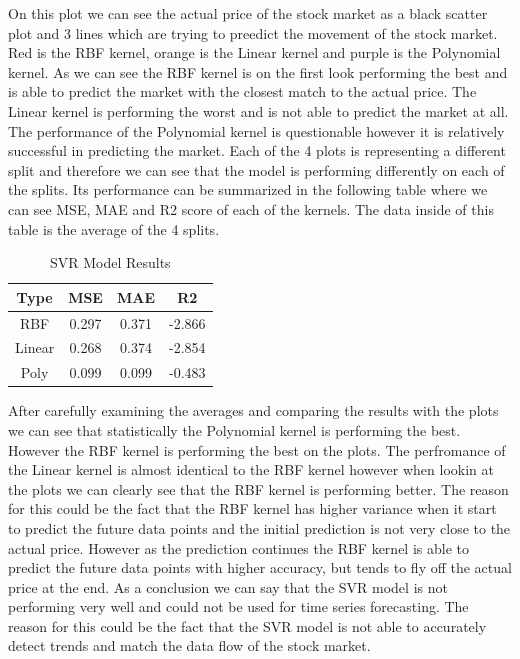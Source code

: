 \documentclass{imc-inf}
\begin{document}
			On this plot we can see the actual price of the stock market as a black scatter plot and 3 lines which are trying to preedict the movement of the stock market. Red is the RBF kernel, orange is the Linear kernel and purple is the Polynomial kernel.
			As we can see the RBF kernel is on the first look performing the best and is able to predict the market with the closest match to the actual price. The Linear kernel is performing the worst and is not able to predict the market at all.
			The performance of the Polynomial kernel is questionable however it is relatively successful in predicting the market. Each of the 4 plots is representing a different split and therefore we can see that the model is performing differently on each of the splits.
			Its performance can be summarized in the following table where we can see MSE, MAE and R2 score of each of the kernels. The data inside of this table is the average of the 4 splits.
			
			
			\begin{table}[h!]
				\centering
				\begin{tabular}{|c|c|c|c|}
					\hline
					\textbf{Type} &\textbf{MSE} & \textbf{MAE} & \textbf{R2} \\ \hline
					RBF & 0.297 & 0.371 & -2.866 \\ \hline
					Linear & 0.268 & 0.374 & -2.854 \\ \hline
					Poly & 0.099 & 0.099 & -0.483 \\ \hline
				\end{tabular}
				\caption{SVR Model Results}
				\label{tab:svr_model_results}
			\end{table}
			After carefully examining the averages and comparing the results with the plots we can see that statistically the Polynomial kernel is performing the best. However the RBF kernel is performing the best on the plots.
			 The perfromance of the Linear kernel is almost identical to the RBF kernel however when lookin at the plots we can clearly see that the RBF kernel is performing better. The reason for this could be the fact that the RBF kernel has higher variance
			 when it start to predict the future data points and the initial prediction is not very close to the actual price. However as the prediction continues the RBF kernel is able to predict the future data points with higher accuracy, 
			 but tends to fly off the actual price at the end. As a conclusion we can say that the SVR model is not performing very well and could not be used for time series forecasting. The reason for this could be the fact that the SVR model is not able to 
			accurately detect trends and match the data flow of the stock market.
\end{document}

